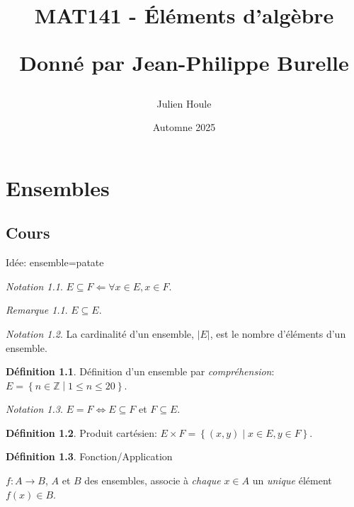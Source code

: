 \documentclass{report}
\title{MAT141 - \'El\'ements d'alg\`ebre

Donn\'e par Jean-Philippe Burelle}
\author{Julien Houle}
\date{Automne 2025}
\newcounter{cours}
\newcommand*{\cours}{\section*{Cours \thecours}\stepcounter{cours}}
\newcommand*{\card}[1]{\left| #1 \right|}
\theoremstyle{definition}
\newtheorem*{defin}{D\'efinition}
\theoremstyle{remark}
\newtheorem*{nota}{Notation}
\newtheorem*{rema}{Remarque}
\begin{document}
	\maketitle
	\tableofcontents
	\newpage

	\chapter{Ensembles}
	\cours
	Id\'ee: ensemble=patate


	\begin{nota}
		$E \subseteq F \Leftarrow \forall x \in E, x \in F$.
		\begin{rema}
			$E \subseteq E$.
		\end{rema}
	\end{nota}

	\begin{nota}
		La cardinalit\'e d'un ensemble, $\card{E}$, est le nombre d'\'el\'ements d'un ensemble.
	\end{nota}

	\begin{defin}
		D\'efinition d'un ensemble par \emph{compr\'ehension}: $E=\left\lbrace n \in \mathbb{Z} \middle| 1 \leq n \leq 20 \right\rbrace$.
	\end{defin}

	\begin{nota}
		$E=F \Leftrightarrow E \subseteq F$ et $F \subseteq E$.
	\end{nota}

	\begin{defin}
		Produit cart\'esien: $E \times F=\left\lbrace (x,y) \middle| x \in E, y \in F \right\rbrace$.
	\end{defin}

	\begin{defin}
		Fonction/Application

		$f: A \to B$, $A$ et $B$ des ensembles, associe \`a \emph{chaque} $x \in A$ un \emph{unique} \'el\'ement $f(x) \in B$.
	\end{defin}
\end{document}
